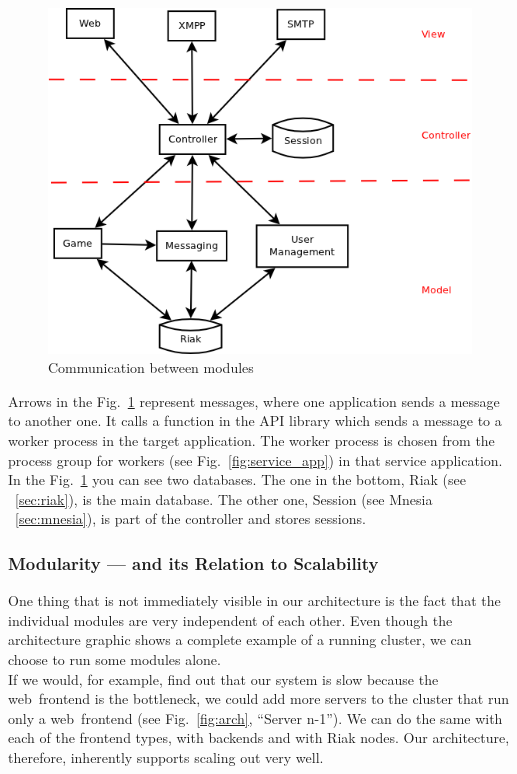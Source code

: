 \documentclass[11pt,a4paper]{report}
\begin{document}
\begin{figure}[h]
 \centering
 \includegraphics[width=12cm]{./graphics/Modules_Communication.png}
 \caption{Communication between modules}
 \label{fig:mod_conn}
\end{figure}

Arrows in the Fig.~\ref{fig:mod_conn} represent messages, where one application
sends a message to another one. It calls a function in the API library
which sends a message to a worker process in the target application. The worker
process is chosen from the process group for workers
(see Fig.~\ref{fig:service_app}) in that service application. In the
Fig.~\ref{fig:mod_conn} you can see two databases. The one in the bottom, Riak
(see ~\ref{sec:riak}), is the main database. The other one, Session
(see Mnesia ~\ref{sec:mnesia}), is part of the controller and stores sessions.

\subsubsection{Modularity --- and its Relation to Scalability}
One thing that is not immediately visible in our architecture is the fact that
the individual modules are very independent of each other. Even though the
architecture graphic shows a complete example of a running cluster, we can
choose to run some modules alone. \\
If we would, for example, find out that our system is slow because the
web~frontend is the bottleneck, we could add more servers to the cluster that
run only a web~frontend (see Fig.~\ref{fig:arch}, ``Server n-1'').
We can do the same with each of the frontend types, with backends and with Riak nodes.
Our architecture, therefore, inherently supports scaling out very well.
\end{document}
